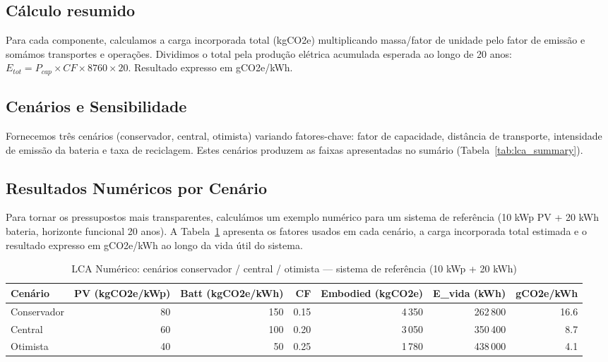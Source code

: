 \documentclass[12pt, a4paper]{article}
\begin{document}
\begin{itemize}
\subsection{Cálculo resumido}
Para cada componente, calculamos a carga incorporada total (kgCO2e) multiplicando massa/fator
de unidade pelo fator de emissão e somámos transportes e operações. Dividimos o total pela
produção elétrica acumulada esperada ao longo de 20 anos: $E_{tot}=P_{cap}\times CF\times 8760\times 20$.
Resultado expresso em gCO2e/kWh.

\subsection{Cenários e Sensibilidade}
Fornecemos três cenários (conservador, central, otimista) variando fatores-chave: fator de
capacidade, distância de transporte, intensidade de emissão da bateria e taxa de reciclagem.
Estes cenários produzem as faixas apresentadas no sumário (Tabela~\ref{tab:lca_summary}).

\subsection{Resultados Numéricos por Cenário}
Para tornar os pressupostos mais transparentes, calculámos um exemplo numérico para um
sistema de referência (10 kWp PV + 20 kWh bateria, horizonte funcional 20 anos). A Tabela~\ref{tab:lca_numeric}
apresenta os fatores usados em cada cenário, a carga incorporada total estimada e o resultado
expresso em gCO2e/kWh ao longo da vida útil do sistema.

\begin{table}[H]
\centering
\caption{LCA Numérico: cenários conservador / central / otimista — sistema de referência (10 kWp + 20 kWh)}
\label{tab:lca_numeric}
\footnotesize
\begin{tabular}{lrrrrrr}
\toprule
\textbf{Cenário} & \textbf{PV (kgCO2e/kWp)} & \textbf{Batt (kgCO2e/kWh)} & \textbf{CF} & \textbf{Embodied (kgCO2e)} & \textbf{E\_vida (kWh)} & \textbf{gCO2e/kWh} \\
\midrule
Conservador & 80 & 150 & 0.15 & 4\,350 & 262\,800 & 16.6 \\
Central & 60 & 100 & 0.20 & 3\,050 & 350\,400 & 8.7 \\
Otimista & 40 & 50 & 0.25 & 1\,780 & 438\,000 & 4.1 \\
\bottomrule
\end{tabular}
\end{table}


\end{itemize}
\end{document}
